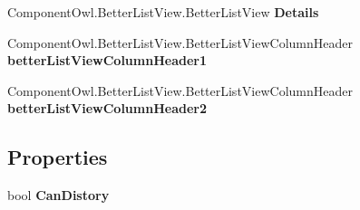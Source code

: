 \begin{DoxyCompactItemize}
\item 
\hypertarget{classlib_watcher_dialog_1_1_property_form_3_01_t_00_01_t2_01_4_a4114ef01e434297916b6a8c5e2571e00}{Component\+Owl.\+Better\+List\+View.\+Better\+List\+View {\bfseries Details}}\label{classlib_watcher_dialog_1_1_property_form_3_01_t_00_01_t2_01_4_a4114ef01e434297916b6a8c5e2571e00}

\item 
\hypertarget{classlib_watcher_dialog_1_1_property_form_3_01_t_00_01_t2_01_4_a60290cf453d0eb39b1eea5621593e616}{Component\+Owl.\+Better\+List\+View.\+Better\+List\+View\+Column\+Header {\bfseries better\+List\+View\+Column\+Header1}}\label{classlib_watcher_dialog_1_1_property_form_3_01_t_00_01_t2_01_4_a60290cf453d0eb39b1eea5621593e616}

\item 
\hypertarget{classlib_watcher_dialog_1_1_property_form_3_01_t_00_01_t2_01_4_ad511bd85800aba578275b695fe045193}{Component\+Owl.\+Better\+List\+View.\+Better\+List\+View\+Column\+Header {\bfseries better\+List\+View\+Column\+Header2}}\label{classlib_watcher_dialog_1_1_property_form_3_01_t_00_01_t2_01_4_ad511bd85800aba578275b695fe045193}

\end{DoxyCompactItemize}
\subsection*{Properties}
\begin{DoxyCompactItemize}
\item 
\hypertarget{classlib_watcher_dialog_1_1_property_form_3_01_t_00_01_t2_01_4_a9b71f01e71b91b996c9c9a31178f06ef}{bool {\bfseries Can\+Distory}}\label{classlib_watcher_dialog_1_1_property_form_3_01_t_00_01_t2_01_4_a9b71f01e71b91b996c9c9a31178f06ef}

\end{DoxyCompactItemize}


